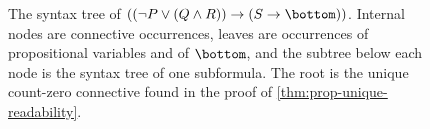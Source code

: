 \begin{figure}[tp]
\centering
{}
\caption{The syntax tree of \(((\neg P\lor(Q\land R))\to(S\to\bottom))\).
Internal nodes are connective occurrences, leaves are occurrences of
propositional variables and of \(\bottom\), and the subtree below each node is
the syntax tree of one subformula.  The root is the unique count-zero
connective found in the proof of \cref{thm:prop-unique-readability}.}
\label{fig:p02-w02-p02-044-syntax-tree}
\end{figure}

